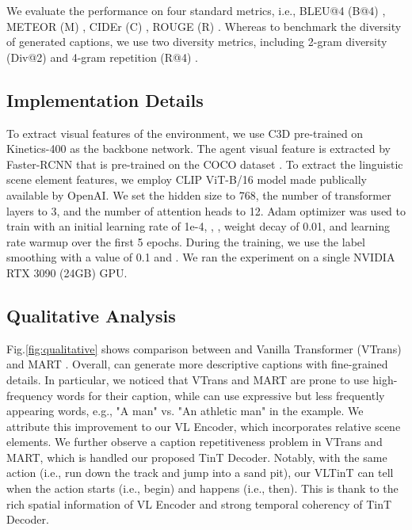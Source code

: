 \documentclass[letterpaper]{article} \usepackage{aaai23}  \usepackage{times}  \usepackage{helvet}  \usepackage{courier}  \usepackage[hyphens]{url}  \usepackage{graphicx} \urlstyle{rm} \def\UrlFont{\rm}  \usepackage{natbib}  \usepackage{caption} \frenchspacing  \setlength{\pdfpagewidth}{8.5in}  \setlength{\pdfpageheight}{11in}  \usepackage{algorithm}
\newcommand{\encoder}{VL Encoder\xspace}
\begin{document}
We evaluate the performance on four standard metrics, i.e., BLEU@4 (B@4) \cite{papineni2002bleu}, METEOR (M) \cite{denkowski2014meteor}, CIDEr (C) \cite{vedantam2015cider}, ROUGE (R) \cite{lin2004rouge}. Whereas to benchmark the diversity of generated captions, we use two diversity metrics, including 2-gram diversity (Div@2) \cite{div} and 4-gram repetition (R@4) \cite{xiong2018move}. 


\subsection{Implementation Details}
To extract visual features of the environment, we use C3D \cite{C3D} pre-trained on Kinetics-400 \cite{Kinetics} as the backbone network. The agent visual feature is extracted by Faster-RCNN \cite{FasterRCNN} that is pre-trained on the COCO dataset \cite{cocodataset}. To extract the linguistic scene element features, we employ CLIP \cite{radford2021learning} ViT-B/16 model made publically available by OpenAI.
We set the hidden size to 768, the number
of transformer layers to 3, and the number of attention heads to 12.
Adam optimizer was used to train \model with an initial learning rate of 1e-4, , ,  weight decay of 0.01, and learning rate warmup over the first 5 epochs. During the training, we use the label smoothing with a value of 0.1 and . We ran the experiment on a single NVIDIA RTX 3090 (24GB) GPU. 



\subsection{Qualitative Analysis}
Fig.\ref{fig:qualitative} shows comparison between \model and Vanilla Transformer (VTrans) \cite{zhou2018end} and MART \cite{lei2020mart}. Overall, \model can generate more descriptive captions with fine-grained details. In particular, we noticed that VTrans and MART are prone to use high-frequency words for their caption, while \model can use expressive but less frequently appearing words, e.g., 
"A man" vs. "An athletic man" in the example. We attribute this improvement to our \encoder, which incorporates relative scene elements. We further observe a caption repetitiveness problem in VTrans and MART, which is handled our proposed TinT Decoder. Notably, with the same action (i.e.,  run down the track and jump into a sand pit), our VLTinT can tell when the action starts (i.e., begin) and happens (i.e., then). This is thank to the rich spatial information of \encoder and strong temporal coherency of TinT Decoder. 
\end{document}
